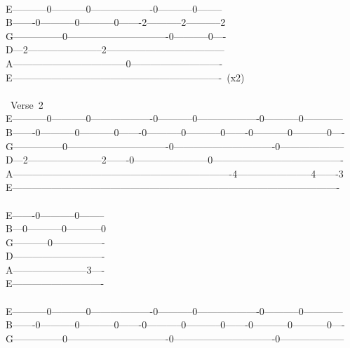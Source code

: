 {\\
E-----------0-----------0-------------------0-----------0--------\\
B-------0-----------0-----------0-------2-----------2-----------2\\
G---------------0-------------------------------0-----------0----\\
D---2-----------------------2------------------------------------\\
A-----------------------------------0----------------------------\\
E----------------------------------------------------------------\ (x2)\\
\\
\lbrack\ Verse\ 2\rbrack\\
E-----------0-----------0-------------------0-----------0-------------------0-----------0------------\\
B-------0-----------0-----------0-------0-----------0-----------0-------0-----------0-----------0----\\
G---------------0-------------------------------0-------------------------------0--------------------\\
D---2-----------------------2-------0-----------------------0----------------------------------------\\
A-------------------------------------------------------------------4-----------------------4-------3\\
E----------------------------------------------------------------------------------------------------\\
\\
E-------0-----------0--------\\
B---0-----------0-----------0\\
G-----------0----------------\\
D----------------------------\\
A-----------------------3----\\
E----------------------------\\
\\
E-----------0-----------0-------------------0-----------0-------------------0-----------0------------\\
B-------0-----------0-----------0-------0-----------0-----------0-------0-----------0-----------0----\\
G---------------0-------------------------------0-------------------------------0--------------------\\
}
